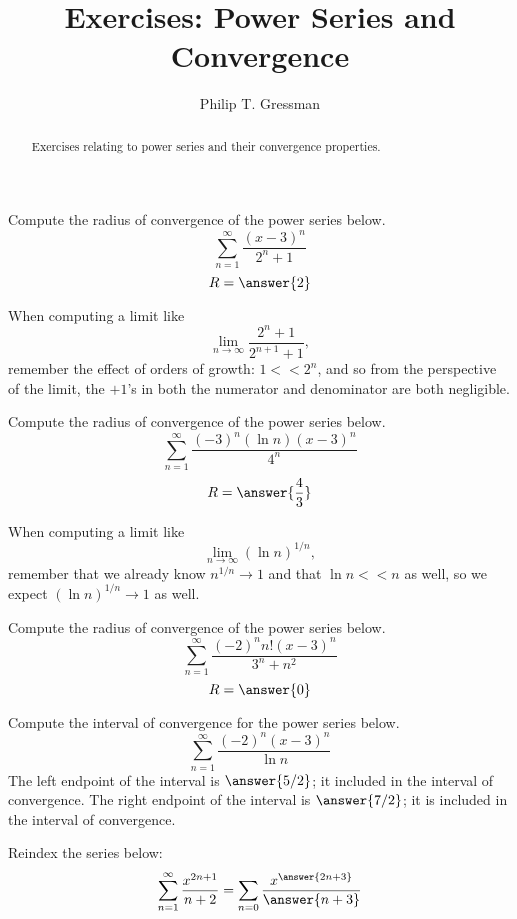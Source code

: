\documentclass{ximera}
\title{Exercises: Power Series and Convergence}
\author{Philip T. Gressman}
\begin{document}
\begin{abstract}
Exercises relating to power series and their convergence properties.
\end{abstract}
\maketitle

\begin{exercise}
Compute the radius of convergence of the power series below.
\[ \sum_{n = 1}^\infty \frac{(x-3)^n}{2^n + 1} \]
\[ R = \answer{2} \]
\begin{hint}
When computing a limit like
\[ \lim_{n \rightarrow \infty} \frac{2^{n} + 1}{2^{n+1} + 1}, \]
remember the effect of orders of growth: $1 <\!\!< 2^n$, and so from the perspective of the limit, the $+1$'s in both the numerator and denominator are both negligible.
\end{hint}
\end{exercise}

\begin{exercise}
Compute the radius of convergence of the power series below.
\[ \sum_{n = 1}^\infty \frac{(-3)^n (\ln n) (x-3)^n}{4^n} \]
\[ R = \answer{\frac{4}{3}} \]
\begin{hint}
When computing a limit like
\[ \lim_{n \rightarrow \infty} (\ln n)^{1/n}, \]
remember that we already know $n^{1/n} \rightarrow 1$ and that $\ln n <\!\!<n$ as well, so we expect $(\ln n)^{1/n} \rightarrow 1$ as well.
\end{hint}
\end{exercise}

\begin{exercise}
Compute the radius of convergence of the power series below.
\[ \sum_{n = 1}^\infty \frac{(-2)^n n! (x-3)^n}{3^n+n^2} \]
\[ R = \answer{0} \]
\end{exercise}

\begin{exercise}
Compute the interval of convergence for the power series below.
\[ \sum_{n=1}^\infty \frac{(-2)^n (x-3)^n}{\ln n} \]
The left endpoint of the interval is $\answer{5/2}$; it  included in the interval of convergence.
The right endpoint of the interval is $\answer{7/2}$; it is  included in the interval of convergence.
\end{exercise}

\begin{exercise}
Reindex the series below:
\[ \sum_{n=1}^\infty \frac{x^{2n+1}}{n + 2} = \sum_{n = 0} \frac{x^{\answer{2n+3}}}{\answer{n+3}} \]
\end{exercise}
\end{document}
